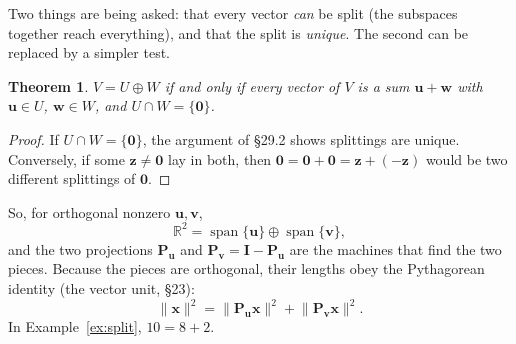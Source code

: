 \documentclass[11pt]{article}
\theoremstyle{plain}
\newtheorem{thm}{Theorem}[section]
\theoremstyle{definition}
\theoremstyle{remark}
\newcommand{\R}{\mathbb{R}}
\newcommand{\vc}[1]{\mathbf{#1}}
\newcommand{\mt}[1]{\mathbf{#1}}
\newcommand{\norm}[1]{\lVert #1\rVert}
\DeclareMathOperator{\spanop}{span}
\begin{document}
\noindent Two things are being asked: that every vector \emph{can} be split
(the subspaces together reach everything), and that the split is
\emph{unique}. The second can be replaced by a simpler test.

\begin{thm}
\label{thm:directsum}
$V=U\oplus W$ if and only if every vector of $V$ is a sum $\vc{u}+\vc{w}$ with
$\vc{u}\in U$, $\vc{w}\in W$, and $U\cap W=\{\vc{0}\}$.
\end{thm}

\begin{proof}
If $U\cap W=\{\vc{0}\}$, the argument of \S29.2 shows splittings are unique.
Conversely, if some $\vc{z}\neq\vc{0}$ lay in both, then
$\vc{0}=\vc{0}+\vc{0}=\vc{z}+(-\vc{z})$ would be two different splittings of
$\vc{0}$.
\end{proof}

\noindent So, for orthogonal nonzero $\vc{u},\vc{v}$,
\[
  \R^{2}=\spanop\{\vc{u}\}\oplus\spanop\{\vc{v}\},
\]
and the two projections $\mt{P}_{\vc{u}}$ and $\mt{P}_{\vc{v}}=\mt{I}-\mt{P}_{\vc{u}}$
are the machines that find the two pieces. Because the pieces are orthogonal,
their lengths obey the Pythagorean identity (the vector unit, \S23):
\[
  \norm{\vc{x}}^{2}=\norm{\mt{P}_{\vc{u}}\vc{x}}^{2}+\norm{\mt{P}_{\vc{v}}\vc{x}}^{2}.
\]
In Example~\ref{ex:split}, $10=8+2$.

\begin{center}
\end{center}

\end{document}
